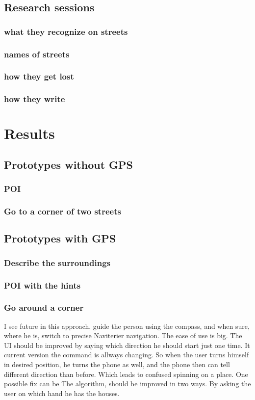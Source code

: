 \documentclass[11pt,oneside,a4paper]{book}
\begin{document}
		\section{Research sessions}
			\subsection{what they recognize on streets}
			\subsection{names of streets}
			\subsection{how they get lost}
			\subsection{how they write}
	
	\chapter{Results}
		\section{Prototypes without GPS}
			\subsection{POI}		
			\subsection{Go to a corner of two streets}					
			
		\section{Prototypes with GPS}
			\subsection{Describe the surroundings}
		
			\subsection{POI with the hints}
			\subsection{Go around a corner}
			I see future in this approach, guide the person using the compass, and when sure, where he is, switch to precise Naviterier navigation.
			The ease of use is big.
			The UI should be improved by saying which direction he should start just one time. It current version the command is allways changing. So when the user turns himself in desired position, he turns the phone as well, and the phone then can tell different direction than before. Which leads to confused spinning on a place. One possible fix can be 
			The algorithm, should be improved in two ways. By asking the user on which hand he has the houses.
\end{document}
